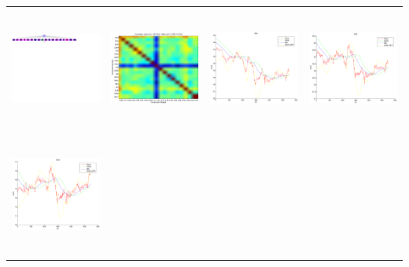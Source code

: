 \begin{tabular}{ |c|c|c|c| }
\includegraphics[width=4.0cm,height=4.0cm]{images/RealTimeFinancialTSMining/klTimeSeries/OIHB.pdf}  &
\includegraphics[width=4.0cm,height=4.0cm]{images/RealTimeFinancialTSMining/klTimeSeries/OIHBCorr.pdf} &
\includegraphics[width=4.0cm,height=4.0cm]{images/RealTimeFinancialTSMining/klTimeSeries/BHIFilteredPriceSeries.pdf} &
\includegraphics[width=4.0cm,height=4.0cm]{images/RealTimeFinancialTSMining/klTimeSeries/BJSFilteredPriceSeries.pdf}  \\
\includegraphics[width=4.0cm,height=4.0cm]{images/RealTimeFinancialTSMining/klTimeSeries/CAMFilteredPriceSeries.pdf}   &

\end{tabular}
